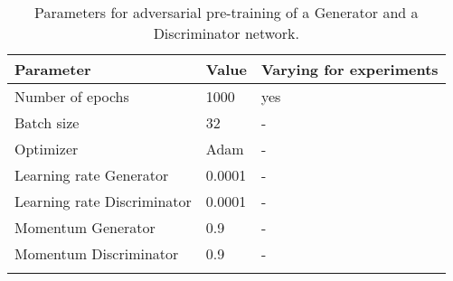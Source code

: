\begin{table}[ht!]
\begin{center}
\caption{Parameters for adversarial pre-training of a Generator and a Discriminator network.}
\begin{tabular}{ M{6cm}  M{2cm} M{2cm}}
\toprule
\textbf{Parameter} & \textbf{Value} & \textbf{Varying for experiments} \\
\midrule
Number of epochs & 1000 & yes\\
Batch size & 32 & -\\
\midrule
Optimizer & Adam & -\\
Learning rate Generator & 0.0001 & -\\
Learning rate Discriminator & 0.0001 & -\\
Momentum Generator & 0.9 & -\\
Momentum Discriminator & 0.9 & -\\
\bottomrule
\label{tab:exp_details_params_pre_train}
\end{tabular}
\end{center}
\end{table}
\FloatBarrier
\noindent